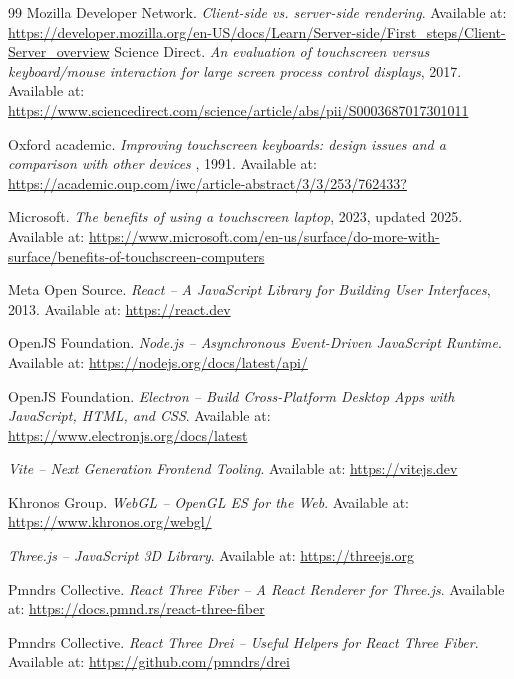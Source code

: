 \documentclass[a4paper,12pt]{article}
\begin{document}
\begin{thebibliography}{99}
Mozilla Developer Network.
\textit{Client-side vs. server-side rendering}.
Available at: \url{https://developer.mozilla.org/en-US/docs/Learn/Server-side/First_steps/Client-Server_overview}
Science Direct.
\textit{An evaluation of touchscreen versus keyboard/mouse interaction for large screen process control displays}, 2017.
Available at: \url{https://www.sciencedirect.com/science/article/abs/pii/S0003687017301011}

Oxford academic.
\textit{Improving touchscreen keyboards: design issues and a comparison with other devices }, 1991.
Available at: \url{https://academic.oup.com/iwc/article-abstract/3/3/253/762433?}

Microsoft.
\textit{The benefits of using a touchscreen laptop}, 2023, updated 2025.
Available at: \url{https://www.microsoft.com/en-us/surface/do-more-with-surface/benefits-of-touchscreen-computers}

Meta Open Source.
\textit{React -- A JavaScript Library for Building User Interfaces}, 2013.
Available at: \url{https://react.dev}

OpenJS Foundation.
\textit{Node.js -- Asynchronous Event-Driven JavaScript Runtime}.
Available at: \url{https://nodejs.org/docs/latest/api/}

OpenJS Foundation.
\textit{Electron -- Build Cross-Platform Desktop Apps with JavaScript, HTML, and CSS}.
Available at: \url{https://www.electronjs.org/docs/latest}

\textit{Vite -- Next Generation Frontend Tooling}.
Available at: \url{https://vitejs.dev}

Khronos Group.
\textit{WebGL -- OpenGL ES for the Web}.
Available at: \url{https://www.khronos.org/webgl/}

\textit{Three.js -- JavaScript 3D Library}.
Available at: \url{https://threejs.org}

Pmndrs Collective.
\textit{React Three Fiber -- A React Renderer for Three.js}.
Available at: \url{https://docs.pmnd.rs/react-three-fiber}

Pmndrs Collective.
\textit{React Three Drei -- Useful Helpers for React Three Fiber}.
Available at: \url{https://github.com/pmndrs/drei}


\end{thebibliography}
\end{document}
